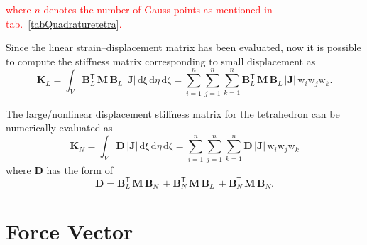 \textcolor{red}{where $n$ denotes the number of Gauss points as mentioned in  tab.~\ref{tabQuadraturetetra}.}

Since the linear strain--displacement matrix has been evaluated, now it is possible to compute the  stiffness matrix corresponding to small displacement as 
\begin{equation}
\mathbf{K}_{L} = \int_{V} \mathbf{B}_L^{\mathsf{T}} \, \mathbf{M} \, \mathbf{B}_L \, |\mathbf{J}| \,  \mathrm{d} \xi \,  \mathrm{d} \eta \,  \mathrm{d} \zeta =  \sum_{i=1}^{n}  \sum_{j=1}^{n}  \sum_{k=1}^{n}  \mathbf{B}_L^{\mathsf{T}} \, \mathbf{M} \, \mathbf{B}_L \, |\mathbf{J}|  \, \mathrm{w}_i \mathrm{w}_j \mathrm{w}_k.
\end{equation}

The large/nonlinear displacement stiffness matrix for the tetrahedron can be numerically evaluated as
\begin{equation}
\mathbf{K}_{N} = \int_{V} \mathbf{D} \, |\mathbf{J}|\, \mathrm{d} \xi \, \mathrm{d} \eta \, \mathrm{d} \zeta
= \sum_{i=1}^{n}  \sum_{j=1}^{n}  \sum_{k=1}^{n}  \mathbf{D} \, |\mathbf{J}| \, \mathrm{w}_i \mathrm{w}_j \mathrm{w}_k
\end{equation}
where $\mathbf{D}$ has the form of 
\begin{equation}
\mathbf{D} = \mathbf{B}_L^{\mathsf{T}} \, \mathbf{M} \, \mathbf{B}_N \, + \mathbf{B}_N^{\mathsf{T}} \, \mathbf{M} \, \mathbf{B}_L \, + \mathbf{B}_N^{\mathsf{T}} \, \mathbf{M} \, \mathbf{B}_N.
\end{equation}










\section{Force Vector}
\label{secForceVectors}


